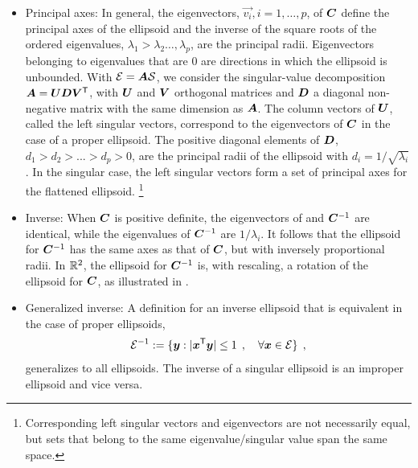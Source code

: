 \begin{itemize}
 \item Principal axes: In general, the eigenvectors, $\vec{v_i}, i=1,\dots,p$,
of $\bm{C}$ define the principal axes of the ellipsoid and
the inverse of the square roots of the ordered
eigenvalues, $\lambda_1 > \lambda_2 \dots, \lambda_p$, are the principal radii.
Eigenvectors belonging to eigenvalues that are 0 are directions in which the ellipsoid is unbounded.
With $\mathcal{E} = \bm{A} \mathcal{S}$, we consider the singular-value decomposition
$  \bm{A}= \bm{U} \bm{D} \bm{V} ^\mathsf{T}$,
with $\bm{U}$ and  $\bm{V}$ orthogonal matrices and  $\bm{D}$  a diagonal non-negative matrix
with the same dimension as $\bm{A}$.
The column vectors of $\bm{U}$, called the left singular vectors,
correspond to the eigenvectors of $\bm{C}$ in the case of a proper ellipsoid.
The positive diagonal elements of $\bm{D}$, $d_1 > d_2 > ... > d_p>0$,
are the principal radii of the ellipsoid with $d_i = 1/\sqrt{\lambda_i}$.
In the singular case, the left singular vectors form a set of principal axes for the flattened ellipsoid.%
\footnote{Corresponding left singular vectors and eigenvectors are not necessarily equal, but sets that belong to the same eigenvalue/singular value span the same space.}

 \item Inverse: When $\bm{C}$ is positive definite, the eigenvectors of  and $\bm{C}^{-1}$ are identical, while
the
 eigenvalues of $\bm{C}^{-1}$ are $1/\lambda_i$. It follows that the ellipsoid for
 $\bm{C}^{-1}$ has the same axes as that of $\bm{C}$, but with inversely proportional radii.
 In $\mathbb{R}^{2}$, the ellipsoid for $\bm{C}^{-1}$
 is, with rescaling, a  rotation of the ellipsoid for $\bm{C}$,
 as illustrated in .

 \item Generalized inverse: A definition for an inverse ellipsoid that is equivalent in the case of proper ellipsoids,
\begin{equation}\label{eq:ellipseginv}
\mathcal{E}^{-1} := \{ \bm{y} :   |\bm{x} ^\mathsf{T} \bm{y}| \le 1 \:\: , \quad \forall \bm{x} \in \mathcal{E} \} \:\: ,
\end{equation}
generalizes to all ellipsoids. The inverse of a singular ellipsoid is an improper ellipsoid and vice versa.


\end{itemize}
